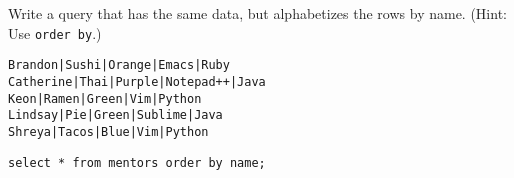 \begin{blocksection}
\question Write a query that has the same data, but alphabetizes the rows by name. (Hint: Use \lstinline$order by$.)

\begin{lstlisting}
Brandon|Sushi|Orange|Emacs|Ruby
Catherine|Thai|Purple|Notepad++|Java
Keon|Ramen|Green|Vim|Python
Lindsay|Pie|Green|Sublime|Java
Shreya|Tacos|Blue|Vim|Python
\end{lstlisting}

\begin{solution}[1in]
\begin{lstlisting}
select * from mentors order by name;
\end{lstlisting}
\end{solution}
\end{blocksection}
